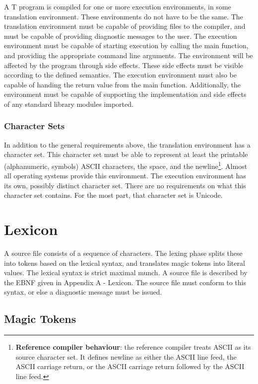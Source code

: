 \documentclass[letterpaper,12pt]{book}
\begin{document}
A T program is compiled for one or more execution environments, in some translation environment. These environments do not have to be the same. The translation environment must be capable of providing files to the compiler, and must be capable of providing diagnostic messages to the user. The execution environment must be capable of starting execution by calling the main function, and providing the appropriate command line arguments. The environment will be affected by the program through side effects. These side effects must be visible according to the defined semantics. The execution environment must also be capable of handing the return value from the main function. Additionally, the environment must be capable of supporting the implementation and side effects of any standard library modules imported.

\subsection{Character Sets}

In addition to the general requirements above, the translation environment has a character set. This character set must be able to represent at least the printable (alphanumeric, symbols) ASCII characters, the space, and the newline\footnote{\textbf{Reference compiler behaviour}: the reference compiler treats ASCII as its source character set. It defines newline as either the ASCII line feed, the ASCII carriage return, or the ASCII carriage return followed by the ASCII line feed.}. Almost all operating systems provide this environment. The execution environment has its own, possibly distinct character set. There are no requirements on what this character set contains. For the most part, that character set is Unicode.

\chapter{Lexicon}

A source file consists of a sequence of characters. The lexing phase splits these into tokens based on the lexical syntax, and translates magic tokens into literal values. The lexical syntax is strict maximal munch. A source file is described by the EBNF given in Appendix A - Lexicon. The source file must conform to this syntax, or else a diagnostic message must be issued.

\section{Magic Tokens}
\end{document}
